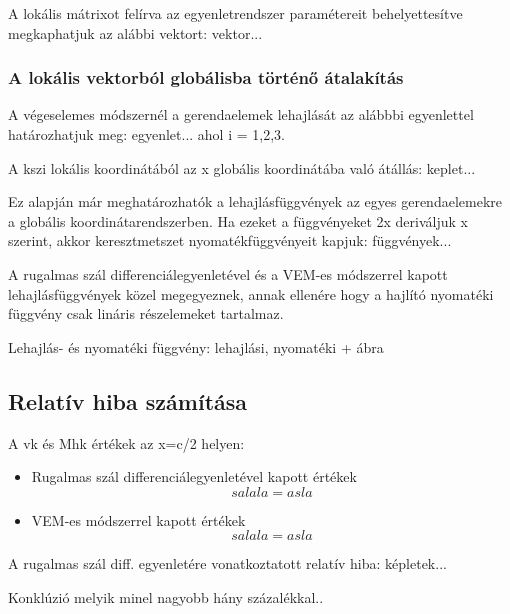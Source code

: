 \documentclass{article}
\begin{document}
		A lokális mátrixot felírva az egyenletrendszer paramétereit behelyettesítve megkaphatjuk az alábbi vektort:
		vektor...
		
	\subsubsection{A lokális vektorból globálisba történő átalakítás}	
		A végeselemes módszernél a gerendaelemek lehajlását az alábbbi egyenlettel határozhatjuk meg:
		egyenlet...
		ahol i = 1,2,3.
		
		A kszi lokális koordinátából az x globális koordinátába való átállás:
		keplet...
		
		Ez alapján már meghatározhatók a lehajlásfüggvények az egyes gerendaelemekre a globális koordinátarendszerben.
		Ha ezeket a függvényeket 2x deriváljuk x szerint, akkor keresztmetszet nyomatékfüggvényeit kapjuk:
		függvények...
		
		A rugalmas szál differenciálegyenletével és a VEM-es módszerrel kapott lehajlásfüggvények közel megegyeznek, annak ellenére hogy a hajlító nyomatéki függvény csak lináris részelemeket tartalmaz.
		
		Lehajlás- és nyomatéki függvény:
		lehajlási, nyomatéki + ábra
	\subsection{Relatív hiba számítása}	
		A vk és Mhk értékek az x=c/2 helyen:
		\begin{itemize}
			\item Rugalmas szál differenciálegyenletével kapott értékek
			\begin{equation}
				salala = asla
			\end{equation}
			\item VEM-es módszerrel kapott értékek
			\begin{equation}
			salala = asla
			\end{equation}
		\end{itemize}
		
		A rugalmas szál diff. egyenletére vonatkoztatott relatív hiba:
		képletek...
		
		Konklúzió melyik minel nagyobb hány százalékkal..
		
		
		
	
	
\end{document}
